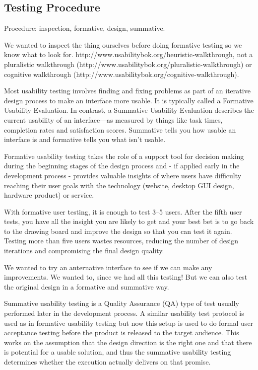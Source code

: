 \documentclass[USenglish,oneside,twocolumn]{article}
\begin{document}
\subsection{Testing Procedure} 
{\color {blue}

Procedure: inspection, formative, design, summative. 

We wanted to inspect the thing ourselves before doing formative testing so we know what to look for. 
http://www.usabilitybok.org/heuristic-walkthrough, not a pluralistic walkthrough (http://www.usabilitybok.org/pluralistic-walkthrough) or cognitive walkthrough (http://www.usabilitybok.org/cognitive-walkthrough). 

Most usability testing involves finding and fixing problems as part of an iterative design process to make an interface more usable. It is typically called a Formative Usability Evaluation. In contrast, a Summative Usability Evaluation describes the current usability of an interface—as measured by things like task times, completion rates and satisfaction scores. Summative tells you how usable an interface is and formative tells you what isn't usable.

Formative usability testing takes the role of a support tool for decision making during the beginning stages of the design process and - if applied early in the development process - provides valuable insights of where users have difficulty reaching their user goals with the technology (website, desktop GUI design, hardware product) or service.

With formative user testing, it is enough to test 3–5 users. After the fifth user tests, you have all the insight you are likely to get and your best bet is to go back to the drawing board and improve the design so that you can test it again. Testing more than five users wastes resources, reducing the number of design iterations and compromising the final design quality.

We wanted to try an anternative interface to see if we can make any improvements. We wanted to, since we had all this testing! But we can also test the original design in a formative and summative way. 

Summative usability testing is a Quality Assurance (QA) type of test usually performed later in the development process. A similar usability test protocol is used as in formative usability testing but now this setup is used to do formal user acceptance testing before the product is released to the target audience. This works on the assumption that the design direction is the right one and that there is potential for a usable solution, and thus the summative usability testing determines whether the execution actually delivers on that promise.
}
\end{document}

